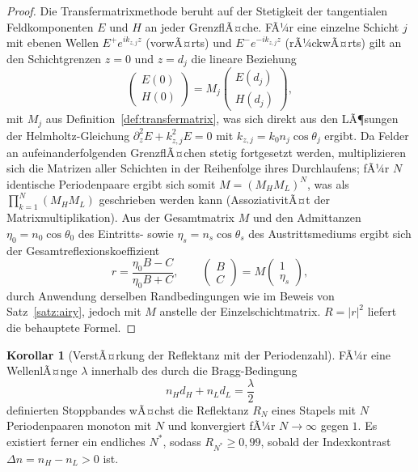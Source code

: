 ﻿\documentclass[a4paper,12pt]{article}
\theoremstyle{definition}
\newtheorem{korollar}{Korollar}
\begin{document}
\begin{proof}
	Die Transfermatrixmethode beruht auf der Stetigkeit der tangentialen
	Feldkomponenten $E$ und $H$ an jeder GrenzflÃ¤che. FÃ¼r eine einzelne
	Schicht $j$ mit ebenen Wellen $E^{+}e^{ik_{z,j}z}$ (vorwÃ¤rts) und
	$E^{-}e^{-ik_{z,j}z}$ (rÃ¼ckwÃ¤rts) gilt an den Schichtgrenzen $z=0$ und
	$z=d_j$ die lineare Beziehung
	\[
	\begin{pmatrix}E(0)\\H(0)\end{pmatrix}
	= M_j \begin{pmatrix}E(d_j)\\H(d_j)\end{pmatrix},
	\]
	mit $M_j$ aus Definition~\ref{def:transfermatrix}, was sich direkt aus
	den LÃ¶sungen der Helmholtz-Gleichung
	$\partial_z^2 E + k_{z,j}^2 E = 0$ mit $k_{z,j}=k_0 n_j\cos\theta_j$
	ergibt. Da Felder an aufeinanderfolgenden GrenzflÃ¤chen stetig fortgesetzt
	werden, multiplizieren sich die Matrizen aller Schichten in der
	Reihenfolge ihres Durchlaufens; fÃ¼r $N$ identische Periodenpaare ergibt
	sich somit $M = (M_HM_L)^N$, was als $\prod_{k=1}^N(M_HM_L)$ geschrieben
	werden kann (AssoziativitÃ¤t der Matrixmultiplikation).
	Aus der Gesamtmatrix $M$ und den Admittanzen $\eta_0=n_0\cos\theta_0$ des
	Eintritts- sowie $\eta_s=n_s\cos\theta_s$ des Austrittsmediums ergibt
	sich der Gesamtreflexionskoeffizient
	\[
	r = \frac{\eta_0 B - C}{\eta_0 B + C}, \qquad
	\begin{pmatrix}B\\C\end{pmatrix} = M
	\begin{pmatrix}1\\\eta_s\end{pmatrix},
	\]
	durch Anwendung derselben Randbedingungen wie im Beweis von
	Satz~\ref{satz:airy}, jedoch mit $M$ anstelle der Einzelschichtmatrix.
	$R=|r|^2$ liefert die behauptete Formel.
\end{proof}

\begin{korollar}[VerstÃ¤rkung der Reflektanz mit der Periodenzahl]
	\label{kor:periodenzahl}
	FÃ¼r eine WellenlÃ¤nge $\lambda$ innerhalb des durch die Bragg-Bedingung
	\[
	n_H d_H + n_L d_L = \frac{\lambda}{2}
	\]
	definierten Stoppbandes wÃ¤chst die Reflektanz $R_N$ eines Stapels mit
	$N$ Periodenpaaren monoton mit $N$ und konvergiert fÃ¼r $N\to\infty$
	gegen $1$. Es existiert ferner ein endliches $N^*$, sodass
	$R_{N^*} \ge 0{,}99$, sobald der Indexkontrast
	$\Delta n = n_H - n_L > 0$ ist.
\end{korollar}
\end{document}
